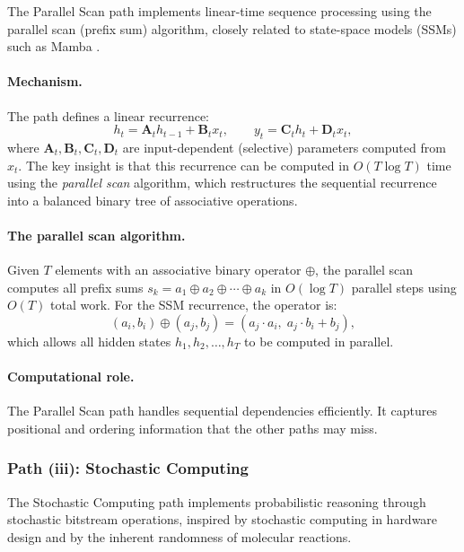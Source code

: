 The Parallel Scan path implements linear-time sequence processing using the parallel scan (prefix sum) algorithm, closely related to state-space models (SSMs) such as Mamba \citep{gu2023mamba}.

\paragraph{Mechanism.} The path defines a linear recurrence:
\begin{equation}
h_t = \mathbf{A}_t h_{t-1} + \mathbf{B}_t x_t, \qquad y_t = \mathbf{C}_t h_t + \mathbf{D}_t x_t,
\label{eq:ssm-recurrence}
\end{equation}
where $\mathbf{A}_t, \mathbf{B}_t, \mathbf{C}_t, \mathbf{D}_t$ are input-dependent (selective) parameters computed from $x_t$. The key insight is that this recurrence can be computed in $O(T \log T)$ time using the \emph{parallel scan} algorithm, which restructures the sequential recurrence into a balanced binary tree of associative operations.

\paragraph{The parallel scan algorithm.} Given $T$ elements with an associative binary operator $\oplus$, the parallel scan computes all prefix sums $s_k = a_1 \oplus a_2 \oplus \cdots \oplus a_k$ in $O(\log T)$ parallel steps using $O(T)$ total work. For the SSM recurrence, the operator is:
\begin{equation}
(a_i, b_i) \oplus (a_j, b_j) = (a_j \cdot a_i, \; a_j \cdot b_i + b_j),
\label{eq:scan-operator}
\end{equation}
which allows all hidden states $h_1, h_2, \ldots, h_T$ to be computed in parallel.

\paragraph{Computational role.} The Parallel Scan path handles sequential dependencies efficiently. It captures positional and ordering information that the other paths may miss.

\subsubsection{Path (iii): Stochastic Computing}
\label{sec:path-stochastic}

The Stochastic Computing path implements probabilistic reasoning through stochastic bitstream operations, inspired by stochastic computing in hardware design and by the inherent randomness of molecular reactions.

